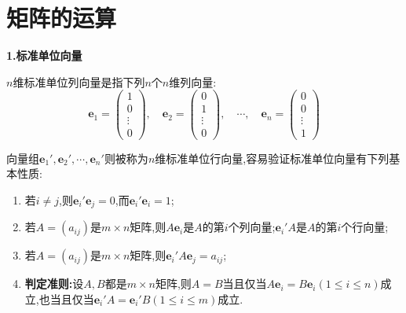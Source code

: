 \documentclass[../../main.tex]{subfiles}%
\begin{document}
\section{矩阵的运算}

\begin{proposition}[标准单位向量和基础矩阵]\label{proposition:标准单位向量和基础矩阵}
\large{\textbf{1.标准单位向量}}

\(n\)维标准单位列向量是指下列\(n\)个\(n\)维列向量:
\[
\boldsymbol{e}_{1}=\left(\begin{array}{c}
1 \\
0 \\
\vdots \\
0
\end{array}\right), \quad \boldsymbol{e}_{2}=\left(\begin{array}{c}
0 \\
1 \\
\vdots \\
0
\end{array}\right), \quad \cdots, \quad \boldsymbol{e}_{n}=\left(\begin{array}{c}
0 \\
0 \\
\vdots \\
1
\end{array}\right)
\]

向量组\(\boldsymbol{e}_{1}', \boldsymbol{e}_{2}', \cdots, \boldsymbol{e}_{n}'\)则被称为\(n\)维标准单位行向量,容易验证标准单位向量有下列基本性质:
\begin{enumerate}
\item 若\(i \neq j\),则\(\boldsymbol{e}_{i}' \boldsymbol{e}_{j}=0\),而\(\boldsymbol{e}_{i}' \boldsymbol{e}_{i}=1\);

\item 若\(A=(a_{ij})\)是\(m\times n\)矩阵,则\(A\boldsymbol{e}_{i}\)是\(A\)的第\(i\)个列向量;\(\boldsymbol{e}_{i}'A\)是\(A\)的第\(i\)个行向量;

\item 若\(A=(a_{ij})\)是\(m\times n\)矩阵,则\(\boldsymbol{e}_{i}'A\boldsymbol{e}_{j}=a_{ij}\);

\item \label{矩阵相等的判定准则}\hypertarget{proposition:矩阵相等的判定法则}{\textbf{判定准则:}}设\(A,B\)都是\(m\times n\)矩阵,则\(A = B\)当且仅当\(A\boldsymbol{e}_{i}=B\boldsymbol{e}_{i}(1\leqslant  i\leqslant  n)\)成立,也当且仅当\(\boldsymbol{e}_{i}'A=\boldsymbol{e}_{i}'B(1\leqslant  i\leqslant  m)\)成立.
\end{enumerate}


\end{proposition}
\end{document}
